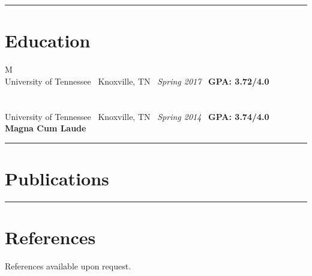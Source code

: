 \documentclass[10pt]{article}%
\begin{document}
\par\noindent\rule{\textwidth}{0.4pt}
\section*{\faUniversity{} Education}
     \begin{tabularx}{\linewidth}{M}%
       \\
      University of Tennessee \textemdash ~Knoxville, TN \textemdash ~\textit{Spring 2017} \textemdash ~\textbf{GPA: 3.72/4.0} \\
      \\
       \\
      University of Tennessee \textemdash ~Knoxville, TN \textemdash ~\textit{Spring 2014} \textemdash ~\textbf{GPA: 3.74/4.0} \\
      \textbf{Magna Cum Laude} \\
    \end{tabularx}%
\par\noindent\rule{\textwidth}{0.4pt}
\section*{\faBook{} Publications}
\nocite{*}

\par\noindent\rule{\textwidth}{0.4pt}
\section*{\faUserPlus{} References}
References available upon request.
\end{document}
